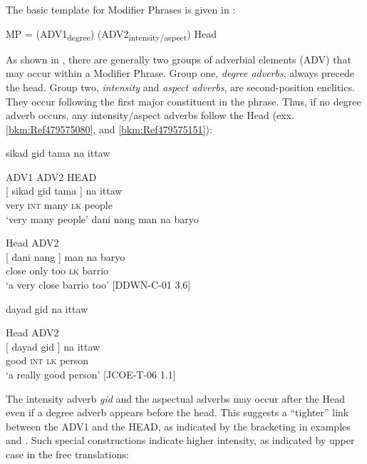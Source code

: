 The basic template for Modifier Phrases is given in :

\ea
\label{bkm:Ref343768497}
\label{bkm:Ref117605153}
MP = (ADV1\textsubscript{degree}) (ADV2\textsubscript{intensity/aspect}) Head
\z

As shown in , there are generally two groups of adverbial elements (ADV) that may occur within a Modifier Phrase. Group one, \textit{degree adverbs}, always precede the head. Group two, \textit{intensity} and \textit{aspect adverbs}, are second-position enclitics. They occur following the first major constituent in the phrase. Thus, if no degree adverb occurs, any intensity/aspect adverbs follow the Head (exx. \ref{bkm:Ref479575080}, and \ref{bkm:Ref479575151}):

\ea
sikad  gid  tama    na  ittaw \\\smallskip

  ADV1  ADV2  HEAD \\
\gll {}[ sikad  gid  tama  ]  na  ittaw \\
{}  very  \textsc{int}  many {} \textsc{lk}  people \\
\glt ‘very many people’
\z
\ea
\label{bkm:Ref479575080}
dani  nang  man  na  baryo \\\smallskip

  Head  ADV2 \\
\gll {}[ dani  nang  ]  man  na  baryo \\
{}  close  only {}     too  \textsc{lk}  barrio \\
\glt ‘a very close barrio too’  [DDWN-C-01 3.6]
\z

\newpage
\ea
\label{bkm:Ref479575151}
dayad  gid    na  ittaw \\\smallskip

  Head  ADV2 \\
\gll {}[ dayad  gid   ]  na  ittaw \\
 {} good  \textsc{int} {}   \textsc{lk}  person \\
\glt ‘a really good person’ [JCOE-T-06 1.1]
\z

The intensity adverb \textit{gid} and the aspectual adverbs may occur after the Head even if a degree adverb appears before the head. This suggests a “tighter” link between the ADV1 and the HEAD, as indicated by the bracketing in examples  and . Such special constructions indicate higher intensity, as indicated by upper case in the free translations:

